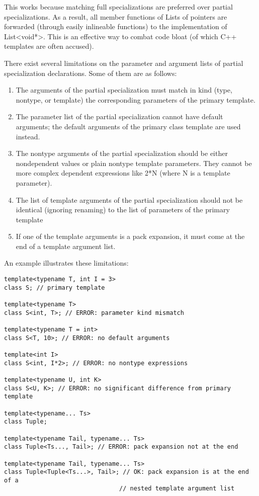 This works because matching full specializations are preferred over partial specializations. As a result, all member functions of Lists of pointers are forwarded (through easily inlineable functions) to the implementation of List<void*>. This is an effective way to combat code bloat (of which C++ templates are often accused).

There exist several limitations on the parameter and argument lists of partial specialization declarations. Some of them are as follows:

\begin{enumerate}
\item 
The arguments of the partial specialization must match in kind (type, nontype, or template) the corresponding parameters of the primary template.

\item 
The parameter list of the partial specialization cannot have default arguments; the default arguments of the primary class template are used instead.

\item 
The nontype arguments of the partial specialization should be either nondependent values or plain nontype template parameters. They cannot be more complex dependent expressions like 2*N (where N is a template parameter).

\item 
The list of template arguments of the partial specialization should not be identical (ignoring renaming) to the list of parameters of the primary template

\item 
If one of the template arguments is a pack expansion, it must come at the end of a template argument list.
\end{enumerate}

An example illustrates these limitations:

\begin{lstlisting}[style=styleCXX]
template<typename T, int I = 3>
class S; // primary template

template<typename T>
class S<int, T>; // ERROR: parameter kind mismatch

template<typename T = int>
class S<T, 10>; // ERROR: no default arguments

template<int I>
class S<int, I*2>; // ERROR: no nontype expressions

template<typename U, int K>
class S<U, K>; // ERROR: no significant difference from primary template

template<typename... Ts>
class Tuple;

template<typename Tail, typename... Ts>
class Tuple<Ts..., Tail>; // ERROR: pack expansion not at the end

template<typename Tail, typename... Ts>
class Tuple<Tuple<Ts...>, Tail>; // OK: pack expansion is at the end of a
								// nested template argument list
\end{lstlisting}


